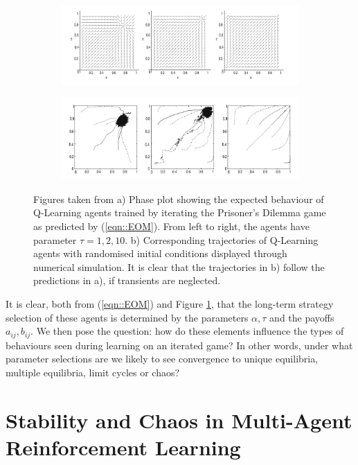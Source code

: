 \documentclass[letterpaper]{article} %
\begin{document}
    \begin{figure}
    \centering
        \begin{subfigure}[b]{0.9 \textwidth}
            \includegraphics[width=0.52 \textwidth]{Figures/Dynamics}
            \caption{}
        \end{subfigure}
        
        \begin{subfigure}[b]{0.9 \textwidth}
            \includegraphics[width=0.5 \textwidth]{Figures/Q-Learners}
            \caption{}
        \end{subfigure}

        \caption{ \label{fig::TuylsExperiments} Figures taken from \cite{Tuyls2006AnGames} a) Phase
        plot showing the expected behaviour of Q-Learning agents trained by iterating the
        Prisoner's Dilemma game as predicted by (\ref{eqn::EOM}). From left to right, the agents
        have parameter $\tau = 1, 2, 10$. b) Corresponding trajectories of Q-Learning agents with
        randomised initial conditions displayed through numerical simulation. It is clear that the
        trajectories in b) follow the predictions in a), if transients are neglected. }
    \end{figure}    

    It is clear, both from (\ref{eqn::EOM}) and Figure \ref{fig::TuylsExperiments}, that the long-term strategy selection of
    these agents is determined by the parameters $\alpha, \tau$ and the payoffs $a_{ij}, b_{ij}$. We
    then pose the question: how do these elements influence the types of behaviours seen during
    learning on an iterated game? In other words, under what parameter selections are we likely to
    see convergence to unique equilibria, multiple equilibria, limit cycles or chaos?

\section{Stability and Chaos in Multi-Agent Reinforcement Learning}
\end{document}
